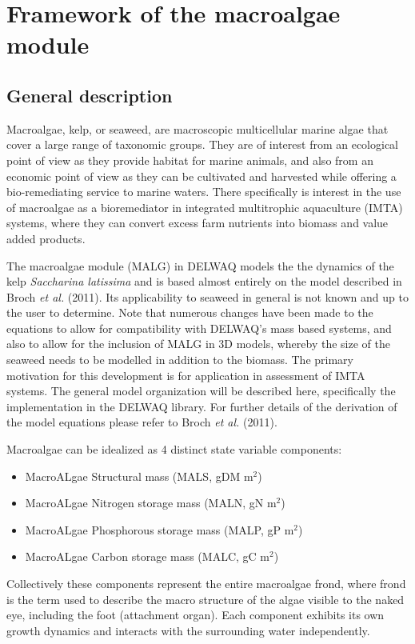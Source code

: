 \documentclass{deltares_manual}
\begin{document}
\section{Framework of the macroalgae module}

\subsection{General description}

Macroalgae, kelp, or seaweed, are macroscopic multicellular marine algae that cover a large range of taxonomic groups. They are of interest from an ecological point of view as they provide habitat for marine animals, and also from an economic point of view as they can be cultivated and harvested while offering a bio-remediating service to marine waters. There specifically is interest in the use of macroalgae as a bioremediator in integrated multitrophic aquaculture (IMTA) systems, where they can convert excess farm nutrients into biomass and value added products. 

The macroalgae module (MALG) in DELWAQ models the the dynamics of the kelp \textit{Saccharina latissima} and is based almost entirely on the model described in Broch \textit{et al.} (2011). Its applicability to seaweed in general is not known and up to the user to determine. Note that numerous changes have been made to the equations to allow for compatibility with DELWAQ's mass based systems, and also to allow for the inclusion of MALG in 3D models, whereby the size of the seaweed needs to be modelled in addition to the biomass. The primary motivation for this development is for application in assessment of IMTA systems. The general model organization will be described here, specifically the implementation in the DELWAQ library. For further details of the derivation of the model equations please refer to Broch \textit{et al.} (2011).

Macroalgae can be idealized as 4 distinct state variable components:
\begin{itemize}
\item MacroALgae Structural mass (MALS, gDM m$^{2}$)
\item MacroALgae Nitrogen storage mass (MALN, gN m$^{2}$)
\item MacroALgae Phosphorous storage mass (MALP, gP m$^{2}$)
\item MacroALgae Carbon storage mass (MALC, gC m$^{2}$)
\end{itemize}
Collectively these components represent the entire macroalgae frond, where frond is the term used to describe the macro structure of the algae visible to the naked eye, including the foot (attachment organ). Each component exhibits its own growth dynamics and interacts with the surrounding water independently. 
\end{document}
